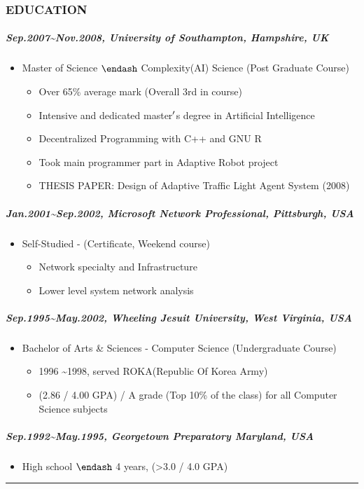 \documentclass[12pt,a4paper]{article}
\begin{document}
\subsubsection{EDUCATION}
\subparagraph{Sep.2007{\textasciitilde}Nov.2008, University of Southampton, Hampshire, UK}
\begin{itemize}
\item Master of Science \ensuremath{\endash} Complexity(AI) Science (Post Graduate Course)

\begin{itemize}
\item Over 65\% average mark (Overall 3rd in course)


\item Intensive and dedicated master\ensuremath{\rq}s degree in Artificial Intelligence


\item Decentralized Programming with C++ and GNU R


\item Took main programmer part in Adaptive Robot project


\item THESIS PAPER: Design of Adaptive Traffic Light Agent System (2008)

\end{itemize}
\end{itemize}
\subparagraph{Jan.2001{\textasciitilde}Sep.2002, Microsoft Network Professional, Pittsburgh, USA}
\begin{itemize}
\item Self-Studied - (Certificate, Weekend course)

\begin{itemize}
\item Network specialty and Infrastructure


\item Lower level system network analysis

\end{itemize}
\end{itemize}
\subparagraph{Sep.1995{\textasciitilde}May.2002, Wheeling Jesuit University, West Virginia, USA}
\begin{itemize}
\item Bachelor of Arts \& Sciences - Computer Science (Undergraduate Course)

\begin{itemize}
\item 1996 {\textasciitilde}1998, served ROKA(Republic Of Korea Army) 


\item (2.86 / 4.00 GPA) / A grade (Top 10\% of the class) for all Computer Science subjects

\end{itemize}
\end{itemize}
\subparagraph{Sep.1992{\textasciitilde}May.1995, Georgetown Preparatory Maryland, USA}
\begin{itemize}
\item High school \ensuremath{\endash} 4 years, (>3.0 / 4.0 GPA)

\end{itemize}
\rule{\textwidth}{1pt}
\end{document}
